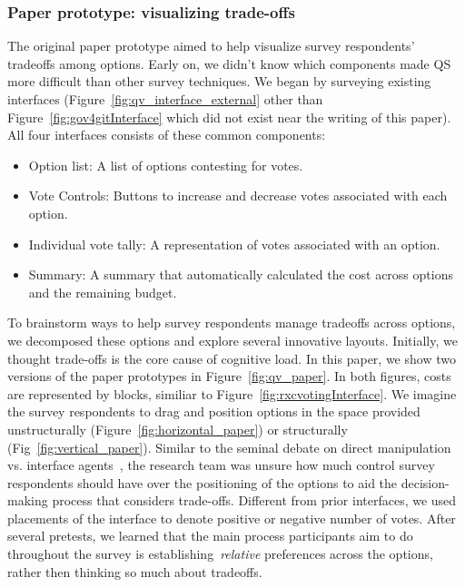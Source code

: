 \subsubsection{Paper prototype: visualizing trade-offs}
The original paper prototype aimed to help visualize survey respondents' tradeoffs among options. Early on, we didn't know which components made QS more difficult than other survey techniques. We began by surveying existing interfaces (Figure~\ref{fig:qv_interface_external} other than Figure~\ref{fig:gov4gitInterface} which did not exist near the writing of this paper). All four interfaces consists of these common components:
\begin{itemize}
    \item Option list: A list of options contesting for votes.
    \item Vote Controls: Buttons to increase and decrease votes associated with each option.
    \item Individual vote tally: A representation of votes associated with an option.
    \item Summary: A summary that automatically calculated the cost across options and the remaining budget.
\end{itemize}

To brainstorm ways to help survey respondents manage tradeoffs across options, we decomposed these options and explore several innovative layouts. Initially, we thought trade-offs is the core cause of cognitive load. In this paper, we show two versions of the paper prototypes in Figure~\ref{fig:qv_paper}. In both figures, costs are represented by blocks, similiar to Figure~\ref{fig:rxcvotingInterface}. We imagine the survey respondents to drag and position options in the space provided unstructurally (Figure~\ref{fig:horizontal_paper}) or structurally (Fig~\ref{fig:vertical_paper}). Similar to the seminal debate on direct manipulation vs. interface agents~\cite{shneidermanDirectManipulationVs1997}, the research team was unsure how much control survey respondents should have over the positioning of the options to aid the decision-making process that considers trade-offs. Different from prior interfaces, we used placements of the interface to denote positive or negative number of votes. After several pretests, we learned that the main process participants aim to do throughout the survey is establishing~\textit{relative} preferences across the options, rather then thinking so much about tradeoffs.

